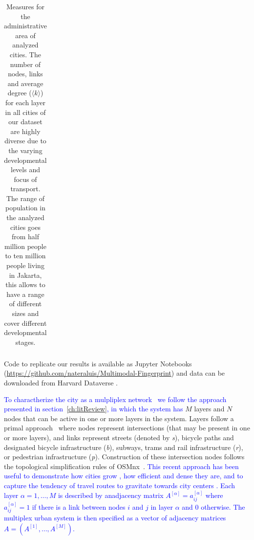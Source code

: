 \begin{table}[ht!]
\begin{adjustbox}{width=\textwidth,keepaspectratio}
\begin{tabular}{l|rrr|rrr|rrr|rrr|r}
		\end{tabular}
	\end{adjustbox}
	\caption[Layers measures for analyzed cities]{Measures for the administrative area of analyzed cities. The number of nodes, links and average degree ($\langle k \rangle$) for each layer in all cities of our dataset are highly diverse due to the varying developmental levels and focus of transport. The range of population in the analyzed cities goes from half million people to ten million people living in Jakarta, this allows to
		have a range of different sizes and cover different developmental stages.
		\label{tab:MultiplexCities}}
\end{table}

Code to replicate our results is available as Jupyter Notebooks (\url{https://github.com/nateraluis/Multimodal-Fingerprint}) and data can be downloaded from Harvard Dataverse \cite{natera2019data}.

\textcolor{blue}{To charactherize the city as a mulpliplex network~\cite{boccaletti2014structure,kivela2014multilayer,battiston2017new} we follow the approach presented in section~\ref{ch:litReview}, in which the system has} $M$ layers and $N$ nodes that can be active in one or more layers in the system. Layers follow a primal approach~\cite{porta2006primal} where nodes represent intersections (that may be present in one or more layers), and links represent streets (denoted by \textit{s}), bicycle paths and designated bicycle infrastructure (\textit{b}), subways, trams and rail infrastructure (\textit{r}), or pedestrian infrastructure (\textit{p}). Construction of these intersection nodes follows the topological simplification rules of OSMnx~\cite{boeing2017osmnx}. \textcolor{blue}{ This recent approach has been useful to demonstrate how cities grow \cite{strano2012evolution,Barthelemy2013Evolution}, how efficient \cite{Gallotti2014Efficiency} and dense they are, and to capture the tendency of travel routes to gravitate towards city centers \cite{Lee2017Morphology}. Each layer $\alpha = 1,\dots, M$ is described by anadjacency matrix $A^{[\alpha]} = {a^{[\alpha]}_{ij}}$ where $a^{[\alpha]}_{ij} = 1$ if there is a link between nodes $i$ and $j$ in layer $\alpha$ and 0 otherwise. The multiplex urban system is then specified as a vector of adjacency matrices $A = (A^{[1]},\dots,A^{[M]})$.}

